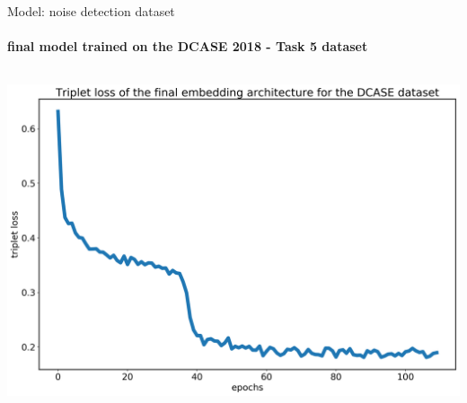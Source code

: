 \documentclass[aspectratio=169, professionalfonts]{beamer}
\begin{document}
\begin{frame}{Model: noise detection dataset}
    \framesubtitle{final model trained on the DCASE 2018 - Task 5 dataset}
    
    \begin{columns}
        \centering
        \includegraphics[width=1.0\textwidth,keepaspectratio]{images/Triplet_loss_DCASE_final.png}
    

\end{columns}
\end{frame}
\end{document}
